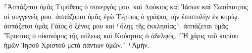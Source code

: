 \documentclass{openreader}
\begin{document}
⸀Ἀσπάζεται ὑμᾶς Τιμόθεος ὁ συνεργός μου, καὶ Λούκιος καὶ Ἰάσων καὶ Σωσίπατρος οἱ συγγενεῖς μου. 
ἀσπάζομαι ὑμᾶς ἐγὼ Τέρτιος ὁ γράψας τὴν ἐπιστολὴν ἐν κυρίῳ. 
ἀσπάζεται ὑμᾶς Γάϊος ὁ ξένος μου καὶ ⸂ὅλης τῆς ἐκκλησίας⸃. ἀσπάζεται ὑμᾶς Ἔραστος ὁ οἰκονόμος τῆς πόλεως καὶ Κούαρτος ὁ ἀδελφός. 
⸂Ἡ χάρις τοῦ κυρίου ἡμῶν Ἰησοῦ Χριστοῦ μετὰ πάντων ὑμῶν.⸃ ⸀Ἀμήν. 
\end{document}
